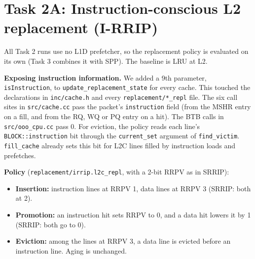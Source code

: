 \documentclass[10pt]{article}
\begin{document}
\section*{Task 2A: Instruction-conscious L2 replacement (I-RRIP)}
All Task 2 runs use no L1D prefetcher, so the replacement policy is evaluated on its own (Task 3 combines it with SPP). The baseline is LRU at L2.

{\sloppy \textbf{Exposing instruction information.} We added a 9th parameter, \texttt{isInstruction}, to \texttt{update\_replacement\_state} for every cache. This touched the declarations in \texttt{inc/cache.h} and every \texttt{replacement/*\_repl} file. The six call sites in \texttt{src/cache.cc} pass the packet's \texttt{instruction} field (from the MSHR entry on a fill, and from the RQ, WQ or PQ entry on a hit). The BTB calls in \texttt{src/ooo\_cpu.cc} pass 0. For eviction, the policy reads each line's \texttt{BLOCK::instruction} bit through the \texttt{current\_set} argument of \texttt{find\_victim}. \texttt{fill\_cache} already sets this bit for L2C lines filled by instruction loads and prefetches.\par}

\textbf{Policy} (\texttt{replacement/irrip.l2c\_repl}, with a 2-bit RRPV as in SRRIP):
\begin{itemize}[nosep]
\item \textbf{Insertion:} instruction lines at RRPV 1, data lines at RRPV 3 (SRRIP: both at 2).
\item \textbf{Promotion:} an instruction hit sets RRPV to 0, and a data hit lowers it by 1 (SRRIP: both go to 0).
\item \textbf{Eviction:} among the lines at RRPV 3, a data line is evicted before an instruction line. Aging is unchanged.
\end{itemize}
\end{document}
